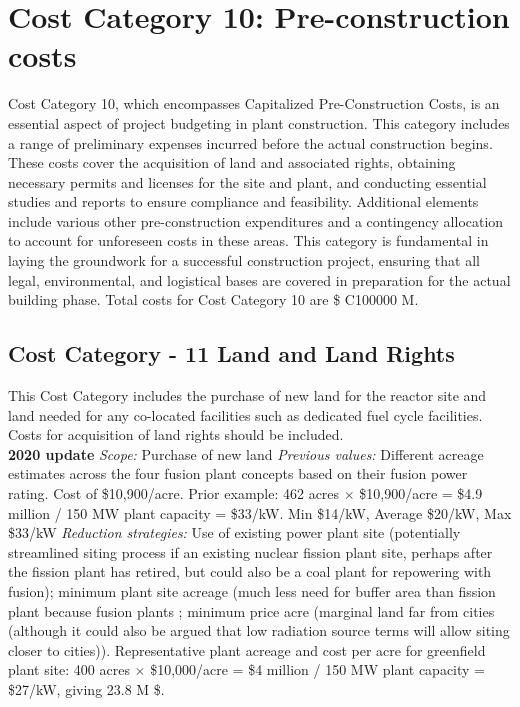 \section{Cost Category 10: Pre-construction costs} 

Cost Category 10, which encompasses Capitalized Pre-Construction Costs, is an essential aspect of project budgeting in plant construction. This category includes a range of preliminary expenses incurred before the actual construction begins. These costs cover the acquisition of land and associated rights, obtaining necessary permits and licenses for the site and plant, and conducting essential studies and reports to ensure compliance and feasibility. Additional elements include various other pre-construction expenditures and a contingency allocation to account for unforeseen costs in these areas. This category is fundamental in laying the groundwork for a successful construction project, ensuring that all legal, environmental, and logistical bases are covered in preparation for the actual building phase.  Total costs for Cost Category 10 are \$ C100000 M.

\subsection*{Cost Category - 11 Land and Land Rights}
This Cost Category includes the purchase of new land for the reactor site and land needed for any co-located facilities such as dedicated fuel cycle facilities.  Costs for acquisition of land rights should be included. \\

 \textbf{2020 update} 
\emph{Scope: }Purchase of new land 
 \emph{Previous values: } 
Different acreage estimates across the four fusion plant concepts based on their fusion power rating. Cost of \$10,900/acre. 
Prior example: 462 acres $\times$ \$10,900/acre = \$4.9 million / 150 MW plant capacity =  \$33/kW.  Min \$14/kW, Average \$20/kW, Max \$33/kW  
 \emph{Reduction strategies: } 
 Use of existing power plant site (potentially streamlined siting process if an existing nuclear fission plant site, perhaps after the fission plant has retired, but could also be a coal plant for repowering with fusion); minimum plant site acreage (much less need for buffer area than fission plant because fusion plants ; minimum price acre (marginal land far from cities (although it could also be argued that low radiation source terms will allow siting closer to cities)). 
Representative plant acreage and cost per acre for greenfield plant site: 400 acres $\times$ \$10,000/acre = \$4 million / 150 MW plant capacity = \$27/kW, giving 23.8 M \$.  \\

